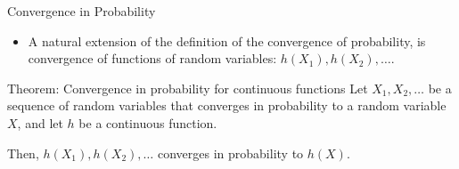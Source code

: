 \begin{frame}[allowframebreaks]{Convergence in Probability}
  
  \begin{itemize}
    \item A natural extension of the definition of the convergence of probability, is convergence of functions of random variables: $h(X_1), h(X_2), \ldots$. 
  \end{itemize}
  
  \begin{block}{Theorem: Convergence in probability for continuous functions}
    Let $X_1, X_2, \ldots$ be a sequence of random variables that converges in probability to a random variable $X$, and let $h$ be a continuous function.
    
    Then, $h(X_1), h(X_2), \ldots$ converges in probability to $h(X)$.
  \end{block}
  
\end{frame}

